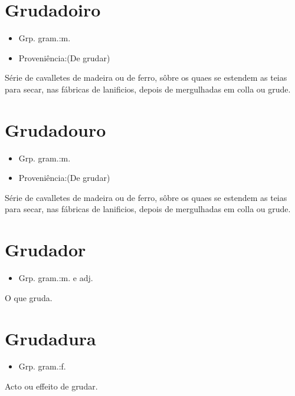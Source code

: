 \section{Grudadoiro}
\begin{itemize}
\item {Grp. gram.:m.}
\end{itemize}
\begin{itemize}
\item {Proveniência:(De \textunderscore grudar\textunderscore )}
\end{itemize}
Série de cavalletes de madeira ou de ferro, sôbre os quaes se estendem as teias para secar, nas fábricas de lanificios, depois de mergulhadas em colla ou grude.
\section{Grudadouro}
\begin{itemize}
\item {Grp. gram.:m.}
\end{itemize}
\begin{itemize}
\item {Proveniência:(De \textunderscore grudar\textunderscore )}
\end{itemize}
Série de cavalletes de madeira ou de ferro, sôbre os quaes se estendem as teias para secar, nas fábricas de lanificios, depois de mergulhadas em colla ou grude.
\section{Grudador}
\begin{itemize}
\item {Grp. gram.:m.  e  adj.}
\end{itemize}
O que gruda.
\section{Grudadura}
\begin{itemize}
\item {Grp. gram.:f.}
\end{itemize}
Acto ou effeito de grudar.
